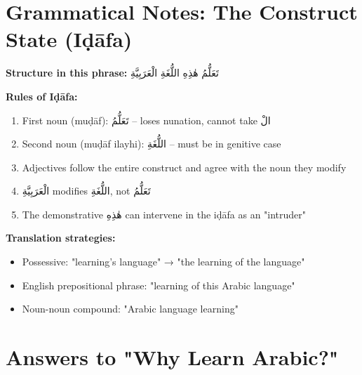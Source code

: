 \documentclass[letterpaper,12pt]{article}
\begin{document}
\section{Grammatical Notes: The Construct State (Iḍāfa)}

\begin{tcolorbox}[colback=boxcolor,colframe=headercolor,breakable]
\textbf{Structure in this phrase:} \textarabic{تَعَلُّمُ هٰذِهِ اللُّغَةِ الْعَرَبِيَّةِ}

\textbf{Rules of Iḍāfa:}
\begin{enumerate}
\item First noun (muḍāf): \textarabic{تَعَلُّمُ} – loses nunation, cannot take \textarabic{الْ}
\item Second noun (muḍāf ilayhi): \textarabic{اللُّغَةِ} – must be in genitive case
\item Adjectives follow the entire construct and agree with the noun they modify
\item \textarabic{الْعَرَبِيَّةِ} modifies \textarabic{اللُّغَةِ}, not \textarabic{تَعَلُّمُ}
\item The demonstrative \textarabic{هٰذِهِ} can intervene in the iḍāfa as an "intruder"
\end{enumerate}

\textbf{Translation strategies:}
\begin{itemize}
\item Possessive: "learning's language" → "the learning of the language"
\item English prepositional phrase: "learning of this Arabic language"
\item Noun-noun compound: "Arabic language learning"
\end{itemize}
\end{tcolorbox}

\section{Answers to "Why Learn Arabic?"}
\end{document}
